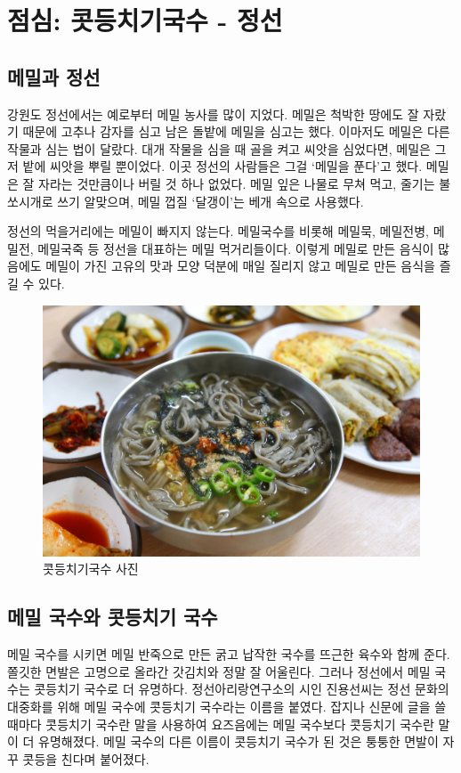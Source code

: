 \section{점심: 콧등치기국수 - 정선}
\subsection{메밀과 정선}
강원도 정선에서는 예로부터 메밀 농사를 많이 지었다. 
메밀은 척박한 땅에도 잘 자랐기 때문에 고추나 감자를 심고 남은 돌밭에 메밀을 심고는 했다. 
이마저도 메밀은 다른 작물과 심는 법이 달랐다. 
대개 작물을 심을 때 골을 켜고 씨앗을 심었다면, 메밀은 그저 밭에 씨앗을 뿌릴 뿐이었다. 
이곳 정선의 사람들은 그걸 `메밀을 푼다'고 했다. 메밀은 잘 자라는 것만큼이나 버릴 것 하나 없었다. 
메밀 잎은 나물로 무쳐 먹고, 줄기는 불쏘시개로 쓰기 알맞으며, 메밀 껍질 `달갱이'는 베개 속으로 사용했다.

정선의 먹을거리에는 메밀이 빠지지 않는다. 메밀국수를 비롯해 메밀묵, 메밀전병, 메밀전, 메밀국죽 등 
정선을 대표하는 메밀 먹거리들이다. 
이렇게 메밀로 만든 음식이 많음에도 메밀이 가진 고유의 맛과 모양 덕분에 매일 질리지 않고 메밀로 만든 음식을 즐길 수 있다. 

\begin{figure}[ht]
    \centering
    \includegraphics[width=.6\textwidth]{s_img/콧등치기국수_사진.JPG}
    \caption{콧등치기국수 사진}
    \label{fig:my_label_s2}
 \end{figure}

\subsection{메밀 국수와 콧등치기 국수}
메밀 국수를 시키면 메밀 반죽으로 만든 굵고 납작한 국수를 뜨근한 육수와 함께 준다. 
쫄깃한 면발은 고명으로 올라간 갓김치와 정말 잘 어울린다. 
그러나 정선에서 메밀 국수는 콧등치기 국수로 더 유명하다. 
정선아리랑연구소의 시인 진용선씨는 정선 문화의 대중화를 위해 메밀 국수에 콧등치기 국수라는 이름을 붙였다. 
잡지나 신문에 글을 쓸 때마다 콧등치기 국수란 말을 사용하여 요즈음에는 메밀 국수보다 콧등치기 국수란 말이 더 유명해졌다. 
메밀 국수의 다른 이름이 콧등치기 국수가 된 것은 퉁퉁한 면발이 자꾸 콧등을 친다며 붙어졌다. 


